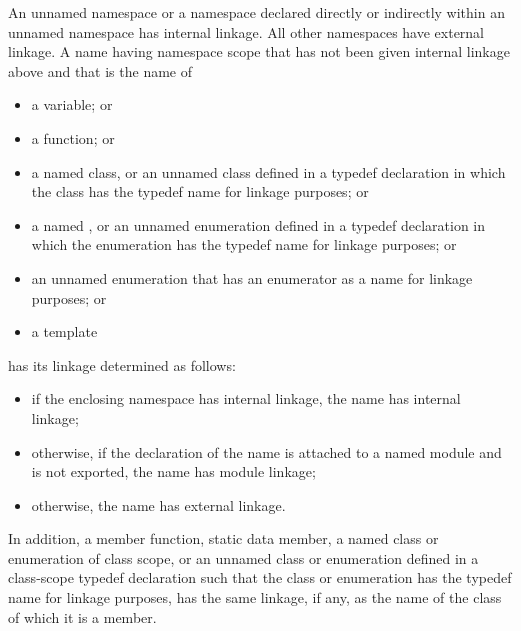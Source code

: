 \pnum
An unnamed namespace or a namespace declared directly or indirectly within an
unnamed namespace has internal linkage. All other namespaces have external linkage.
A name having namespace scope
that has not been given internal linkage above
and that is the name of
\begin{itemize}
\item a variable; or
\item a function; or
\item
{}%
a named class, or an unnamed class defined in a
typedef declaration in which the class has the typedef name for linkage
purposes; or
\item
{}%
a named , or an unnamed enumeration defined
in a typedef declaration in which the enumeration has the typedef name
for linkage purposes; or
\item an unnamed enumeration
that has an enumerator as a name for linkage purposes; or
\item a template
\end{itemize}
has its linkage determined as follows:
\begin{itemize}
\item
if the enclosing namespace has internal linkage,
the name has internal linkage;
\item
otherwise,
if the declaration of the name is
attached to a named module
and is not exported,
the name has module linkage;
\item
otherwise,
the name has external linkage.
\end{itemize}

\pnum
In addition, a member function, static data member, a named class or
enumeration of class scope, or an unnamed class or enumeration defined
in a class-scope typedef declaration such that the class or enumeration
has the typedef name for linkage purposes, has
the same linkage, if any, as the name of the class of which it is a
member.

